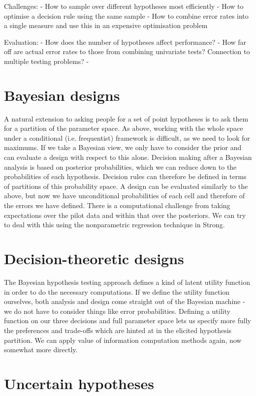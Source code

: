 \documentclass{article} %
\begin{document}
Challenges:
- How to sample over different hypotheses most efficiently
- How to optimise a decision rule using the same sample
- How to combine error rates into a single measure and use this in an expensive optimisation problem

Evaluation:
- How does the number of hypotheses affect performance?
- How far off are actual error rates to those from combining univariate tests? Connection to multiple testing problems?
- 

\section{Bayesian designs}

A natural extension to asking people for a set of point hypotheses is to ask them for a partition of the parameter space.
As above, working with the whole space under a conditional (i.e. frequentist) framework is difficult, as we need to look for maximums.
If we take a Bayesian view, we only have to consider the prior and can evaluate a design with respect to this alone.
Decision making after a Bayesian analysis is based on posterior probabilities, which we can reduce down to the probabilities of each hypothesis.
Decision rules can therefore be defined in terms of partitions of this probability space.
A design can be evaluated similarly to the above, but now we have unconditional probabilities of each cell and therefore of the errors we have defined.
There is a computational challenge from taking expectations over the pilot data and within that over the posteriors. We can try to deal with this using the nonparametric regression technique in Strong.


\section{Decision-theoretic designs}

The Bayesian hypothesis testing approach defines a kind of latent utility function in order to do the necessary computations.
If we define the utility function ourselves, both analysis and design come straight out of the Bayesian machine - we do not have to consider things like error probabilities.
Defining a utility function on our three decisions and full parameter space lets us specify more fully the preferences and trade-offs which are hinted at in the elicited hypothesis partition.
We can apply value of information computation methods again, now somewhat more directly.

\section{Uncertain hypotheses}
\end{document}
